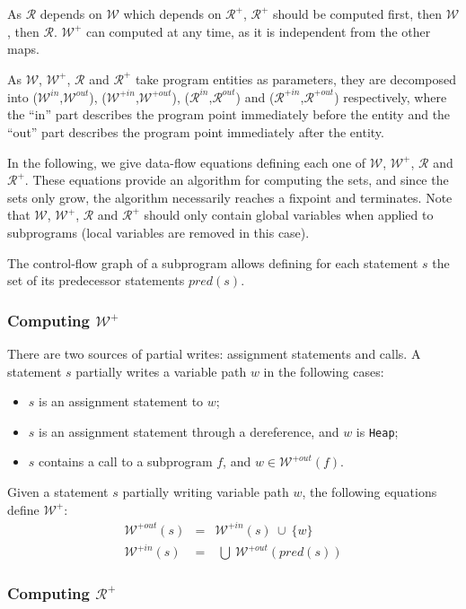 \documentclass{article}
\newcommand{\code}[1]{\texttt{#1}}
\newcommand{\heap}{\code{Heap}\xspace}
\newcommand{\pred}[1]{\ensuremath{\mathit{pred}(#1)}\xspace}
\newcommand{\allwrites}{$\mathcal{W^+}$\xspace}
\newcommand{\Outallwrites}{\ensuremath{\mathcal{W}^{+out}}\xspace}
\newcommand{\Inallwrites}{\ensuremath{\mathcal{W}^{+in}}\xspace}
\newcommand{\inallwrites}[1]{\ensuremath{\mathcal{W}^{+in}(#1)}\xspace}
\newcommand{\outallwrites}[1]{\ensuremath{\mathcal{W}^{+out}(#1)}\xspace}
\newcommand{\writes}{$\mathcal{W}$\xspace}
\newcommand{\Outwrites}{\ensuremath{\mathcal{W}^{out}}\xspace}
\newcommand{\Inwrites}{\ensuremath{\mathcal{W}^{in}}\xspace}
\newcommand{\allreads}{$\mathcal{R^+}$\xspace}
\newcommand{\Outallreads}{\ensuremath{\mathcal{R}^{+out}}\xspace}
\newcommand{\Inallreads}{\ensuremath{\mathcal{R}^{+in}}\xspace}
\newcommand{\reads}{$\mathcal{R}$\xspace}
\newcommand{\Inreads}{\ensuremath{\mathcal{R}^{in}}\xspace}
\newcommand{\Outreads}{\ensuremath{\mathcal{R}^{out}}\xspace}
\newcommand{\union}{~\cup~}
\newcommand{\bigunion}{~\bigcup~}
\begin{document}
As \reads depends on \writes which depends on \allreads, \allreads should be
computed first, then \writes, then \reads. \allwrites can computed at any time, as it is independent from the other maps.

As \writes, \allwrites, \reads and
\allreads take program entities as parameters, they are decomposed into
(\Inwrites,\Outwrites), (\Inallwrites,\Outallwrites), (\Inreads,\Outreads) and
(\Inallreads,\Outallreads) respectively, where the ``in'' part describes the
program point immediately before the entity and the ``out'' part describes the
program point immediately after the entity.

In the following, we give data-flow equations defining each one of \writes,
\allwrites, \reads and \allreads. These equations provide an algorithm for
computing the sets, and since the sets only grow, the algorithm necessarily
reaches a fixpoint and terminates. Note that \writes, \allwrites, \reads and
\allreads should only contain global variables when applied to subprograms
(local variables are removed in this case).

The control-flow graph of a subprogram allows defining for each statement $s$
the set of its predecessor statements \pred{s}.

\subsubsection{Computing \allwrites}

There are two sources of partial writes: assignment statements and calls. A
statement $s$ partially writes a variable path $w$ in the following cases:
\begin{itemize}
\item $s$ is an assignment statement to $w$;
\item $s$ is an assignment statement through a dereference, and $w$ is \heap;
\item $s$ contains a call to a subprogram $f$, and $w \in \outallwrites{f}$.
\end{itemize}

Given a statement $s$ partially writing variable path $w$, the following
equations define \allwrites:
\begin{eqnarray*}
\outallwrites{s} &=& \inallwrites{s} \union \{w\}\\
\inallwrites{s} &=& \bigunion \outallwrites{\pred{s}}
\end{eqnarray*}

\subsubsection{Computing \allreads}
\end{document}
